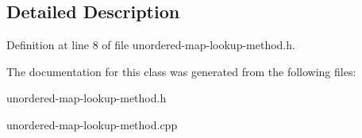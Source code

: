\subsection{Detailed Description}


Definition at line 8 of file unordered-\/map-\/lookup-\/method.\+h.



The documentation for this class was generated from the following files\+:\begin{DoxyCompactItemize}
\item 
unordered-\/map-\/lookup-\/method.\+h\item 
unordered-\/map-\/lookup-\/method.\+cpp\end{DoxyCompactItemize}

